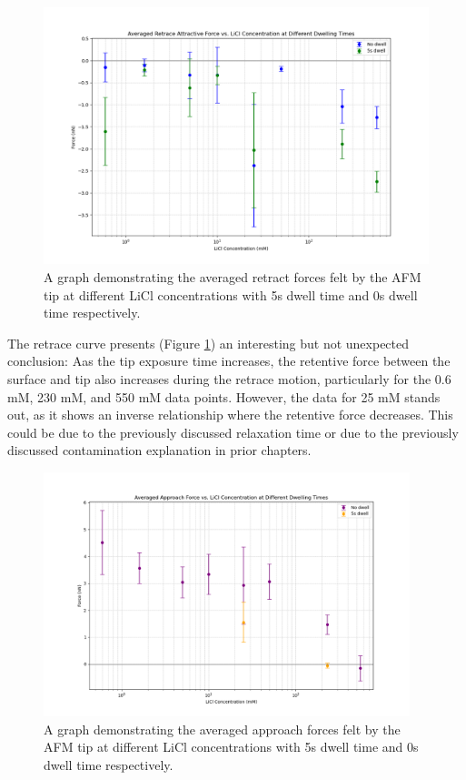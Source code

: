 \begin{figure}[h!]
\centering
\includegraphics[width=\textwidth]{chapter7/Dwell/Retrace overall.png}
\caption{A graph demonstrating the averaged retract forces felt by the AFM tip at different LiCl concentrations with 5s dwell time and 0s dwell time respectively.}
\label{fig:RetractDwell}
\end{figure}

The retrace curve presents (Figure \ref{fig:RetractDwell}) an interesting but not unexpected conclusion: Aas the tip exposure time increases, the retentive force between the surface and tip also increases during the retrace motion, particularly for the 0.6 mM, 230 mM, and 550 mM data points. However, the data for 25 mM stands out, as it shows an inverse relationship where the retentive force decreases. This could be due to the previously discussed relaxation time or due to the previously discussed contamination explanation in prior chapters.

\begin{figure}[h!]
\centering
\includegraphics[width=0.95\textwidth]{chapter7/Dwell/Approach overall.png}
\caption{A graph demonstrating the averaged approach forces felt by the AFM tip at different LiCl concentrations with 5s dwell time and 0s dwell time respectively.}
\label{fig:ApproachDwell}
\end{figure}

